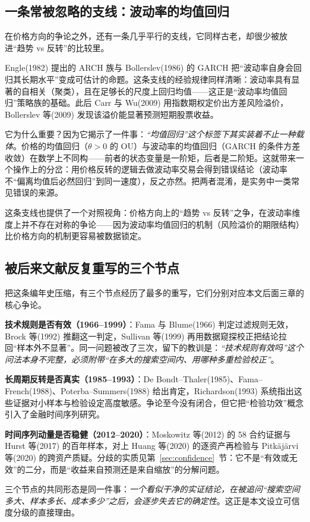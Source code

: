 \subsection{一条常被忽略的支线：波动率的均值回归}

在价格方向的争论之外，还有一条几乎平行的支线，它同样古老，却很少被放进“趋势 vs 反转”的比较里。

Engle(1982) 提出的 ARCH 族与 Bollerslev(1986) 的 GARCH 把“波动率自身会回归其长期水平”变成可估计的命题\cite{engle1982,bollerslev1986}。这条支线的经验规律同样清晰：波动率具有显著的自相关（聚类），且在足够长的尺度上回归均值——这正是“波动率均值回归”策略族的基础。此后 Carr 与 Wu(2009) 用指数期权定价出方差风险溢价\cite{carrwu2009}，Bollerslev 等(2009) 发现该溢价能显著预测短期股票收益\cite{bollerslev2009}。

它为什么重要？因为它揭示了一件事：\emph{“均值回归”这个标签下其实装着不止一种载体}。价格的均值回归（$\theta>0$ 的 OU）与波动率的均值回归（GARCH 的条件方差收敛）在数学上不同构——前者的状态变量是一阶矩，后者是二阶矩。这就带来一个操作上的分岔：用价格反转的逻辑去做波动率交易会得到错误结论（波动率不“偏离均值后必然回归”到同一速度），反之亦然。把两者混淆，是实务中一类常见错误的来源。

这条支线也提供了一个对照视角：价格方向上的“趋势 vs 反转”之争，在波动率维度上并不存在对称的争论——因为波动率均值回归的机制（风险溢价的期限结构）比价格方向的机制更容易被数据锁定。

\subsection{被后来文献反复重写的三个节点}

把这条编年史压缩，有三个节点经历了最多的重写，它们分别对应本文后面三章的核心争论。

\textbf{技术规则是否有效（1966--1999）}：Fama 与 Blume(1966) 判定过滤规则无效\cite{famablume1966}，Brock 等(1992) 推翻这一判定\cite{brock1992}，Sullivan 等(1999) 再用数据窥探校正把结论拉回“样本外不显著”\cite{sullivan1999}。同一问题被改了三次，留下的教训是：\emph{“技术规则有效吗”这个问法本身不完整，必须附带“在多大的搜索空间内、用哪种多重检验校正”}。

\textbf{长周期反转是否真实（1985--1993）}：De Bondt--Thaler(1985)、Fama--French(1988)、Poterba--Summers(1988) 给出肯定\cite{debondt1985,famafrench1988,poterbsummers1988}，Richardson(1993) 系统指出这些证据对小样本与检验设定高度敏感\cite{richardson1993}。争论至今没有闭合，但它把“检验功效”概念引入了金融时间序列研究。

\textbf{时间序列动量是否稳健（2012--2020）}：Moskowitz 等(2012) 的 58 合约证据\cite{mop2012}与 Hurst 等(2017) 的百年样本\cite{hop2017}，对上 Huang 等(2020) 的逐资产再检验\cite{huang2020}与 Pitkäjärvi 等(2020) 的跨资产质疑\cite{pitkajarvi2020}。分歧的实质见第~\ref{sec:confidence}~节：它不是“有效或无效”的二分，而是“收益来自预测还是来自缩放”的分解问题。

三个节点的共同形态是同一件事：\emph{一个看似干净的实证结论，在被追问“搜索空间多大、样本多长、成本多少”之后，会逐步失去它的确定性}。这正是本文设立可信度分级的直接理由。
